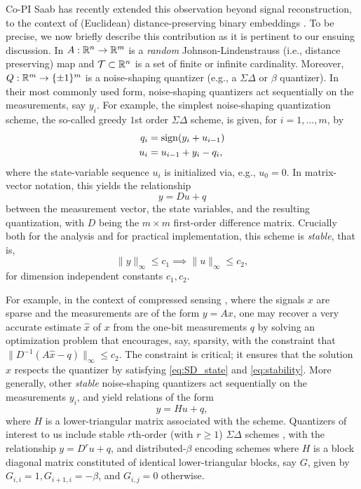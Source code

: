 Co-PI Saab has recently  extended this observation  beyond signal reconstruction, to the context of (Euclidean) distance-preserving binary embeddings \cite{huynh2018fast}. To be precise, we now briefly describe this contribution as it is pertinent to our ensuing discussion. In \cite{huynh2018fast}  $A: \mathbb{R}^n \to \mathbb{R}^m$ is a \emph{random} Johnson-Lindenstrauss (i.e., distance preserving) map and  $\mathcal{T}\subset \mathbb{R}^n$ is a set of finite or infinite cardinality. Moreover, $Q:\mathbb{R}^m \to \{\pm 1\}^m$ is a noise-shaping quantizer (e.g., a $\Sigma\Delta$ \cite{stuff} or $\beta$ \cite{stuff} quantizer). In their most commonly used form, noise-shaping quantizers act sequentially on the measurements, say $y_i$. For example, the simplest noise-shaping quantization scheme, the so-called greedy $1$st order $\Sigma\Delta$ scheme, is given, for $i=1,...,m$, by 
\begin{align}
    q_i &= \mathrm{sign}(y_i+u_{i-1})\\
    u_i &= u_{i-1} + y_i -q_i,
\end{align}
where the state-variable sequence $u_i$ is initialized via, e.g., $u_0=0$. In matrix-vector notation, this yields the relationship \begin{equation}y=Du+q\label{eq:SD_state}\end{equation}  between the measurement vector, the state variables, and the resulting quantization, with $D$ being the $m\times m$ first-order difference matrix. Crucially both for the analysis and for practical implementation, this scheme is \emph{stable}, that is, \begin{equation}\|y\|_\infty \leq c_1 \implies \|u\|_\infty \leq c_2,\label{eq:stability}\end{equation}
for dimension independent constants $c_1,c_2$.


For example, in the context of compressed sensing \cite{donoho2006compressed,candes2006stable}, where the signals $x$ are sparse and the measurements are of the form $y = Ax$, one may recover a very accurate estimate $\hat{x}$ of $x$ from the one-bit measurements $q$ by solving an optimization problem  that encourages, say, sparsity, with the constraint that $\|D^{-1}(A\hat{x}-q)\|_\infty \leq c_2$. The constraint is critical; it ensures that the solution $\hat{x}$ respects the quantizer by satisfying \eqref{eq:SD_state}  and \eqref{eq:stability}. More generally, other \emph{stable} noise-shaping quantizers act sequentially on the measurements $y_i$, %
and yield relations of the form 
$$ y=Hu + q,$$ where $H$ is a lower-triangular matrix associated with the scheme. Quantizers of interest to us include
stable $r$th-order (with $r\geq 1$) $\Sigma\Delta$ schemes  \cite{}, with the relationship $y=D^r u+q$, and distributed-$\beta$ encoding schemes \cite{} where $H$ is a block diagonal matrix constituted of identical lower-triangular blocks, say $G$, given by $G_{i,i}=1, G_{i+1,i}=-\beta$, and $G_{i,j}=0$ otherwise.

